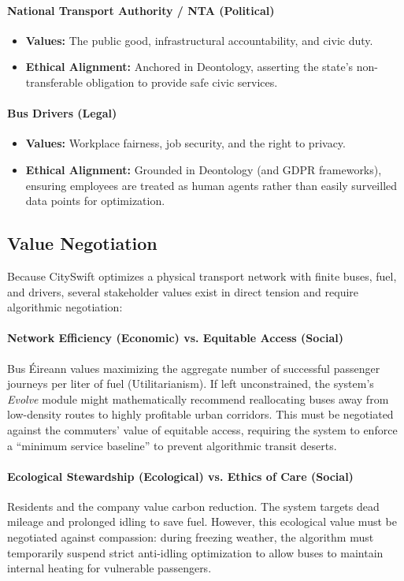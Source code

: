\documentclass[]
{UCD_CS_41820_Report}
\begin{document}
\paragraph{National Transport Authority / NTA (Political)}
\begin{itemize}
  \item \textbf{Values:} The public good, infrastructural accountability, and civic duty.
  \item \textbf{Ethical Alignment:} Anchored in Deontology, asserting the state's non-transferable obligation to provide safe civic services.
\end{itemize}

\paragraph{Bus Drivers (Legal)}
\begin{itemize}
  \item \textbf{Values:} Workplace fairness, job security, and the right to privacy.
  \item \textbf{Ethical Alignment:} Grounded in Deontology (and GDPR frameworks), ensuring employees are treated as human agents rather than easily surveilled data points for optimization.
\end{itemize}

\subsection*{Value Negotiation}

Because CitySwift optimizes a physical transport network with finite buses, fuel, and drivers, several stakeholder values exist in direct tension and require algorithmic negotiation:

\paragraph{Network Efficiency (Economic) vs. Equitable Access (Social)}
Bus Éireann values maximizing the aggregate number of successful passenger journeys per liter of fuel (Utilitarianism). If left unconstrained, the system's \textit{Evolve} module might mathematically recommend reallocating buses away from low-density routes to highly profitable urban corridors. This must be negotiated against the commuters' value of equitable access, requiring the system to enforce a ``minimum service baseline'' to prevent algorithmic transit deserts.

\paragraph{Ecological Stewardship (Ecological) vs. Ethics of Care (Social)}
Residents and the company value carbon reduction. The system targets dead mileage and prolonged idling to save fuel. However, this ecological value must be negotiated against compassion: during freezing weather, the algorithm must temporarily suspend strict anti-idling optimization to allow buses to maintain internal heating for vulnerable passengers.
\end{document}
